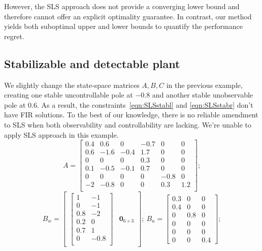 However, the SLS approach does not provide a converging lower bound and therefore cannot offer an explicit optimality guarantee. In contrast, our method yields both suboptimal upper and lower bounds to quantify the performance regret.

\subsection{Stabilizable and detectable plant}
We slightly change the state-space matrices \(A,B,C\) in the previous example, creating one stable uncontrollable pole at \(-0.8\) and another stable unobservable pole at \(0.6\). As a result, the constraints~\eqref{eqn:SLSstabl} and \eqref{eqn:SLSstabr} don't have FIR solutions. To the best of our knowledge, there is no reliable amendment to SLS when both observability and controllability are lacking. We're unable to apply SLS approach in this example.
\begin{equation*}
A = 
\begin{bmatrix}
0.4 & 0.6 & 0 & -0.7 & 0 & 0 \\
0.6  & -1.6 & -0.4 & 1.7 &  0 &  0 \\
0  & 0 & 0 & 0.3 & 0 & 0 \\
0.1  & -0.5  & -0.1 & 0.7 & 0 & 0 \\
0  & 0  & 0 &  0 &  -0.8  &  0 \\
-2  & -0.8 & 0 & 0 &  0.3  &  1.2 \\
\end{bmatrix};
\end{equation*}
\begin{equation*}  
B_w = 
\begin{bmatrix}
\begin{bmatrix}
1 & -1\\
0 & -1\\
0.8 & -2 \\
0.2 & 0\\
0.7 & 1\\
0 & -0.8\\
\end{bmatrix} & \mathbf{0}_{6\times 3}
\end{bmatrix};\  B_u = \begin{bmatrix}
    0.3 & 0 & 0 \\
    0.4 & 0 & 0\\
    0 & 0.8 & 0\\
    0 & 0 & 0\\
    0 & 0 & 0 \\
    0 & 0 & 0.4
\end{bmatrix};
\end{equation*}

